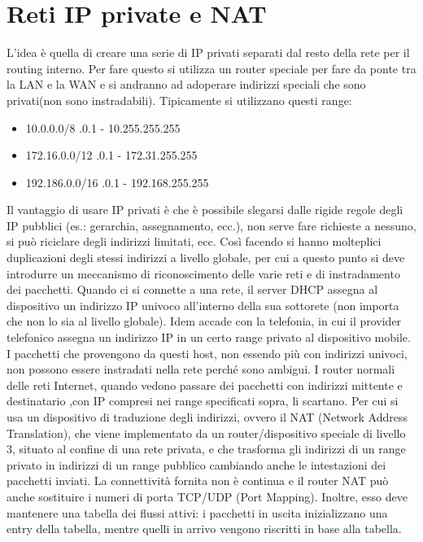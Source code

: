 \section{Reti IP private e NAT}
L’idea è quella di creare una serie di IP privati separati dal resto della rete per il routing interno. Per fare questo si utilizza un router speciale per fare da ponte tra la LAN e la WAN e si andranno ad adoperare indirizzi speciali che sono privati(non sono instradabili). Tipicamente si utilizzano questi range:
\begin{itemize}
  \item 10.0.0.0/8 .0.1 - 10.255.255.255
  \item 172.16.0.0/12 .0.1 - 172.31.255.255
  \item 192.186.0.0/16 .0.1 - 192.168.255.255
\end{itemize}
Il vantaggio di usare IP privati è che è possibile slegarsi dalle rigide regole degli IP pubblici (es.: gerarchia, assegnamento, ecc.), non serve fare richieste a nessuno, si può riciclare degli indirizzi limitati, ecc. Così facendo si hanno molteplici duplicazioni degli stessi indirizzi a livello globale, per cui a questo punto si deve introdurre un meccanismo di riconoscimento delle varie reti e di instradamento dei pacchetti. Quando ci si connette a una rete, il server DHCP assegna al dispositivo un indirizzo IP univoco all’interno della sua sottorete (non importa che non lo sia al livello globale). Idem accade con la telefonia, in cui il provider telefonico assegna un indirizzo IP in un certo range privato al dispositivo mobile. I pacchetti che provengono da questi host, non essendo più con indirizzi univoci, non possono essere instradati nella rete perché sono ambigui. I router normali delle reti Internet, quando vedono passare dei pacchetti con indirizzi mittente e destinatario ,con IP compresi nei range specificati sopra, li scartano. Per cui si usa un dispositivo di traduzione degli indirizzi, ovvero il NAT (Network Address Translation), che viene implementato da un router/dispositivo speciale di livello 3, situato al confine di una rete privata, e che trasforma gli indirizzi di un range privato in indirizzi di un range pubblico cambiando anche le intestazioni dei pacchetti inviati. La connettività fornita non è continua e il router NAT può anche sostituire i numeri di porta TCP/UDP (Port Mapping). Inoltre, esso deve mantenere una tabella dei flussi attivi: i pacchetti in uscita inizializzano una entry della tabella, mentre quelli in arrivo vengono riscritti in base alla tabella.
